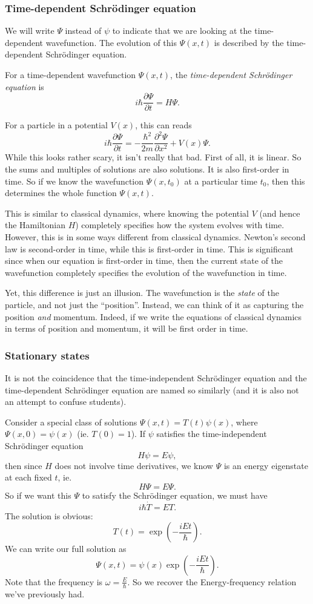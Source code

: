 \documentclass[a4paper]{article}
\begin{document}
\subsubsection*{Time-dependent Schr\"odinger equation}
We will write $\Psi$ instead of $\psi$ to indicate that we are looking at the time-dependent wavefunction. The evolution of this $\Psi(x, t)$ is described by the time-dependent Schr\"odinger equation.
\begin{defi}
  For a time-dependent wavefunction $\Psi(x, t)$, the \emph{time-dependent Schr\"odinger equation} is
  \[
    i\hbar \frac{\partial \Psi}{\partial t} = H\Psi.\tag{$*$}
  \]
\end{defi}
For a particle in a potential $V(x)$, this can reads
\[
  i\hbar \frac{\partial \Psi}{\partial t} = -\frac{\hbar^2}{2m}\frac{\partial^2 \Psi}{\partial x^2} + V(x) \Psi.
\]
While this looks rather scary, it isn't really that bad. First of all, it is linear. So the sums and multiples of solutions are also solutions. It is also first-order in time. So if we know the wavefunction $\Psi(x, t_0)$ at a particular time $t_0$, then this determines the whole function $\Psi(x, t)$.

This is similar to classical dynamics, where knowing the potential $V$ (and hence the Hamiltonian $H$) completely specifies how the system evolves with time. However, this is in some ways different from classical dynamics. Newton's second law is second-order in time, while this is first-order in time. This is significant since when our equation is first-order in time, then the current state of the wavefunction completely specifies the evolution of the wavefunction in time.

Yet, this difference is just an illusion. The wavefunction is the \emph{state} of the particle, and not just the ``position''. Instead, we can think of it as capturing the position \emph{and} momentum. Indeed, if we write the equations of classical dynamics in terms of position and momentum, it will be first order in time.

\subsubsection*{Stationary states}
It is not the coincidence that the time-independent Schr\"odinger equation and the time-dependent Schr\"odinger equation are named so similarly (and it is also not an attempt to confuse students).

Consider a special class of solutions $\Psi(x, t) = T(t) \psi(x)$, where $\Psi(x, 0) = \psi(x)$ (ie. $T(0) = 1$). If $\psi$ satisfies the time-independent Schr\"odinger equation
\[
  H\psi = E\psi,
\]
then since $H$ does not involve time derivatives, we know $\Psi$ is an energy eigenstate at each fixed $t$, ie.
\[
  H\Psi = E\Psi.
\]
So if we want this $\Psi$ to satisfy the Schr\"odinger equation, we must have
\[
  i\hbar \dot{T} = ET.
\]
The solution is obvious:
\[
  T(t) = \exp\left(-\frac{iEt}{\hbar}\right).
\]
We can write our full solution as
\[
  \Psi(x, t) = \psi(x) \exp\left(-\frac{iEt}{\hbar}\right).
\]
Note that the frequency is $\omega = \frac{E}{\hbar}$. So we recover the Energy-frequency relation we've previously had.
\end{document}
